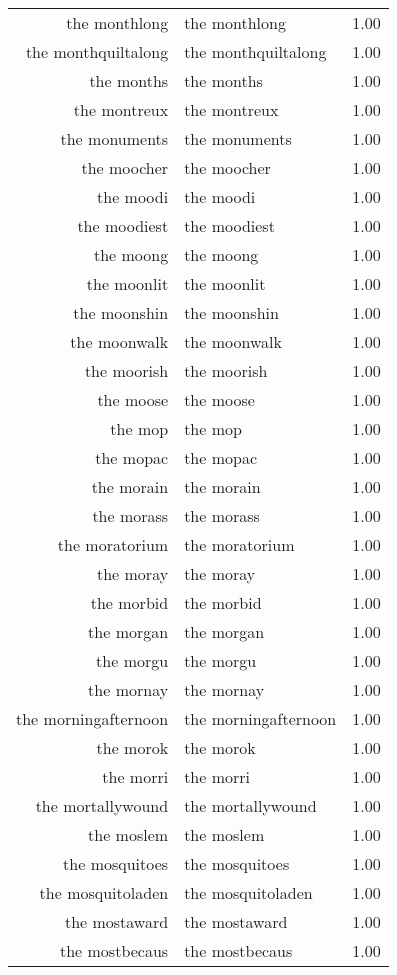\begin{table}[ht]
\begin{tabular}{rlr}
  the monthlong & the monthlong & 1.00 \\ 
  the monthquiltalong & the monthquiltalong & 1.00 \\ 
  the months & the months & 1.00 \\ 
  the montreux & the montreux & 1.00 \\ 
  the monuments & the monuments & 1.00 \\ 
  the moocher & the moocher & 1.00 \\ 
  the moodi & the moodi & 1.00 \\ 
  the moodiest & the moodiest & 1.00 \\ 
  the moong & the moong & 1.00 \\ 
  the moonlit & the moonlit & 1.00 \\ 
  the moonshin & the moonshin & 1.00 \\ 
  the moonwalk & the moonwalk & 1.00 \\ 
  the moorish & the moorish & 1.00 \\ 
  the moose & the moose & 1.00 \\ 
  the mop & the mop & 1.00 \\ 
  the mopac & the mopac & 1.00 \\ 
  the morain & the morain & 1.00 \\ 
  the morass & the morass & 1.00 \\ 
  the moratorium & the moratorium & 1.00 \\ 
  the moray & the moray & 1.00 \\ 
  the morbid & the morbid & 1.00 \\ 
  the morgan & the morgan & 1.00 \\ 
  the morgu & the morgu & 1.00 \\ 
  the mornay & the mornay & 1.00 \\ 
  the morningafternoon & the morningafternoon & 1.00 \\ 
  the morok & the morok & 1.00 \\ 
  the morri & the morri & 1.00 \\ 
  the mortallywound & the mortallywound & 1.00 \\ 
  the moslem & the moslem & 1.00 \\ 
  the mosquitoes & the mosquitoes & 1.00 \\ 
  the mosquitoladen & the mosquitoladen & 1.00 \\ 
  the mostaward & the mostaward & 1.00 \\ 
  the mostbecaus & the mostbecaus & 1.00 \\ 

\end{tabular}
\end{table}
